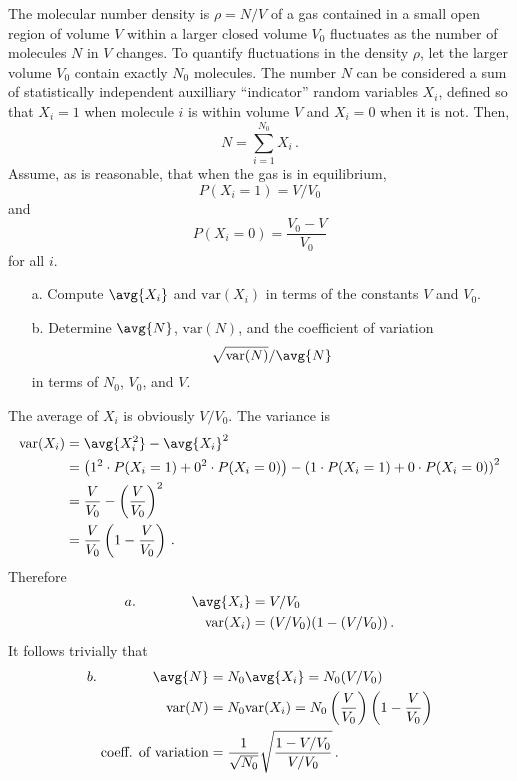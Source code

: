 

The molecular number density is $\rho = N/V$ of a gas contained in a small open region of volume $V$ within a larger closed volume $V_0$ fluctuates as the number of molecules $N$ in $V$ changes.
To quantify fluctuations in the density $\rho$, let the larger volume $V_0$ contain exactly $N_0$ molecules. The number $N$ can be considered a sum of statistically independent auxilliary ``indicator'' random variables $X_i$, defined so that $X_i=1$ when molecule $i$ is within volume $V$ and $X_i=0$ when it is not.
Then,
\begin{equation*}
  N = \sum_{i=1}^{N_0}X_i \, .
\end{equation*}
Assume, as is reasonable, that when the gas is in equilibrium,
\begin{equation*}
  P(X_i=1) = V/V_0
\end{equation*}
and
\begin{equation*}
  P(X_i=0) = \frac{V_0 - V}{V_0}
\end{equation*}
for all $i$.
\begin{itemize}
  \item[a.] Compute $\avg{X_i}$ and $\text{var}(X_i)$ in terms of the constants $V$ and $V_0$.
  \item[b.] Determine $\avg{N}$, $\text{var}(N)$, and the coefficient of variation
    \begin{displaymath}
      \sqrt{\text{var}(N)} / \avg{N}
    \end{displaymath}
    in terms of $N_0$, $V_0$, and $V$.
\end{itemize}

The average of $X_i$ is obviously $V/V_0$.
The variance is
\begin{align*}
  \text{var}(X_i)
  &= \avg{X_i^2} - \avg{X_i}^2 \\
  &= \left( 1^2 \cdot P(X_i=1) + 0^2 \cdot P(X_i=0)\right)
   - \left( 1 \cdot P(X_i=1) + 0 \cdot P(X_i=0)\right)^2 \\
  &= \frac{V}{V_0} - \left( \frac{V}{V_0} \right)^2 \\
  &= \frac{V}{V_0} \left( 1 - \frac{V}{V_0} \right) \, .
\end{align*}
Therefore
\begin{align*}
  a. \qquad \qquad
  \avg{X_i} &= V/V_0 \\
  \text{var}(X_i) &= (V/V_0)(1 - (V/V_0)) \, .
\end{align*}
It follows trivially that
\begin{align*}
  b. \qquad \qquad
  \avg{N} &= N_0 \avg{X_i} = N_0 (V/V_0) \\
  \text{var}(N) &= N_0 \text{var}(X_i) = N_0 \left( \frac{V}{V_0} \right) \left( 1 - \frac{V}{V_0} \right) \\
  \text{coeff. of variation} &= \frac{1}{\sqrt{N_0}} \sqrt{\frac{1 - V/V_0}{V/V_0}} \, .
\end{align*}
